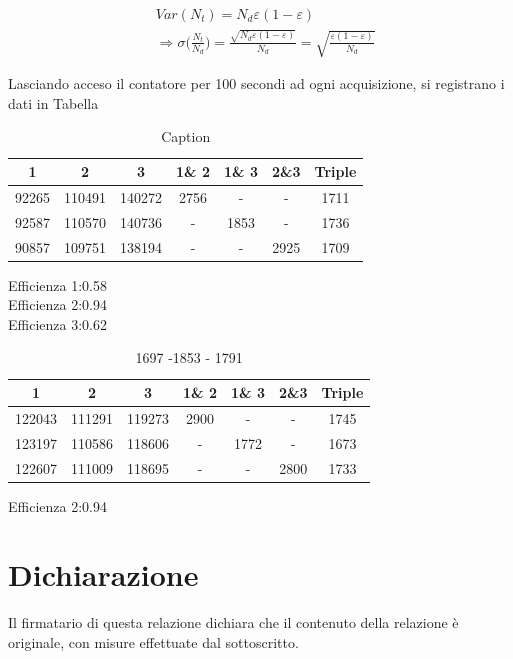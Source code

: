 \documentclass[10pt,a4paper]{article}
\begin{document}
\begin{align}
    &Var(N_t)=N_d\varepsilon(1-\varepsilon)\\
    &\Longrightarrow \sigma\biggl(\frac{N_t}{N_d}\biggr)=\frac{\sqrt{N_d\varepsilon(1-\varepsilon)}}{N_d}=\sqrt{\frac{\varepsilon(1-\varepsilon)}{N_d}}\label{sigma}
\end{align}




Lasciando acceso il contatore per 100 secondi ad ogni acquisizione, si registrano i dati in Tabella

\begin{table}[h]
    \centering
    \begin{tabular}{c|c|c|c|c|c|c}
     1 &  2 &  3 &  1\& 2 &  1\& 3 & 2\&3 & Triple \\
     \midrule
    92265  & 110491  & 140272  & 2756   & -      & -    & 1711   \\
    92587  & 110570  & 140736  & -      & 1853   & -    & 1736   \\
    90857  & 109751  & 138194  & -      & -      & 2925 & 1709   \\
        \end{tabular}
    \caption{Caption}
    \label{tab:my_label}
\end{table}
Efficienza 1:0.58\\
Efficienza 2:0.94\\
Efficienza 3:0.62\\

\begin{table}[h]
    \centering
    \begin{tabular}{c|c|c|c|c|c|c}
     1 &  2 &  3 &  1\& 2 &  1\& 3 & 2\&3 & Triple \\
     \midrule
    122043  & 111291  & 119273  & 2900   & -      & -    & 1745   \\
    123197  & 110586  & 118606  & -      & 1772   & -    & 1673   \\
      122607 & 111009  &  118695  & -      & -      & 2800 & 1733   \\
        \end{tabular}
    \caption{1697 -1853 - 1791}
    \label{tab:my_label}
\end{table}

Efficienza 2:0.94\\




\section*{Dichiarazione}
Il firmatario di questa relazione dichiara che il contenuto della relazione \`e originale, con misure effettuate dal sottoscritto.
\end{document}
